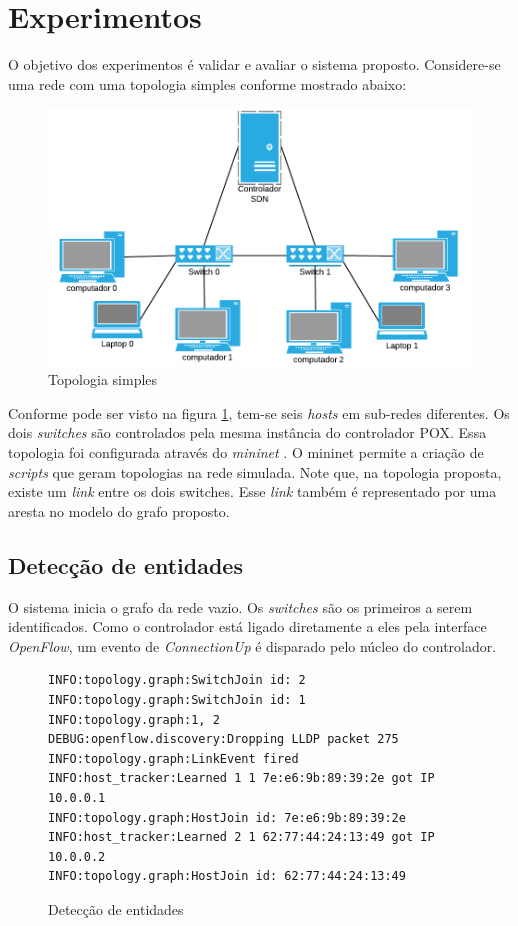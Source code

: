 \section{Experimentos}
\label{sec:experiments}

O objetivo dos experimentos é validar e avaliar o sistema proposto.
Considere-se uma rede com uma topologia simples conforme mostrado abaixo: 

\begin{figure}[h!]
    \centering
    \includegraphics[scale=0.4]{mininet_topology.png}
    \caption{Topologia simples}
    \label{fig:topology}
\end{figure}

Conforme pode ser visto na figura \ref{fig:topology}, tem-se seis \emph{hosts} em sub-redes diferentes. 
Os dois \emph{switches} são controlados pela mesma instância do controlador 
POX.
Essa topologia foi configurada através do \emph{mininet} \citep{lantz2010network}. 
O mininet permite a criação de \emph{scripts} que geram topologias 
na rede simulada. 
Note que, na topologia proposta, existe um \emph{link} entre os dois 
switches.
Esse \emph{link} também é representado por uma aresta no modelo do grafo
proposto.


\subsection{Detecção de entidades}
O sistema inicia o grafo da rede vazio.
Os \emph{switches} são os primeiros a serem identificados. 
Como o controlador está ligado diretamente a eles pela interface 
\emph{OpenFlow}, um evento de \emph{ConnectionUp} é disparado 
pelo núcleo do controlador.

\begin{figure}[h!]
\centering
\begin{lstlisting}
INFO:topology.graph:SwitchJoin id: 2
INFO:topology.graph:SwitchJoin id: 1
INFO:topology.graph:1, 2
DEBUG:openflow.discovery:Dropping LLDP packet 275
INFO:topology.graph:LinkEvent fired
INFO:host_tracker:Learned 1 1 7e:e6:9b:89:39:2e got IP 10.0.0.1
INFO:topology.graph:HostJoin id: 7e:e6:9b:89:39:2e
INFO:host_tracker:Learned 2 1 62:77:44:24:13:49 got IP 10.0.0.2
INFO:topology.graph:HostJoin id: 62:77:44:24:13:49
\end{lstlisting}
\caption{Detecção de entidades}
\label{fig:detection}
\end{figure}


